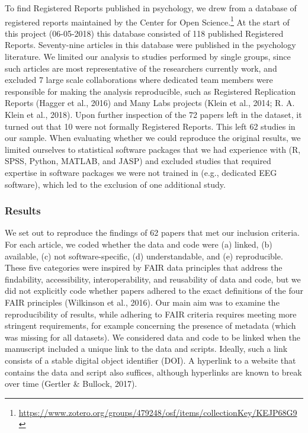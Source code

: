 \documentclass[
  ,jou, a4paper,floatsintext]{apa6}
\begin{document}
To find Registered Reports published in psychology, we drew from a database of registered reports maintained by the Center for Open Science.\footnote{\url{https://www.zotero.org/groups/479248/osf/items/collectionKey/KEJP68G9}} At the start of this project (06-05-2018) this database consisted of 118 published Registered Reports. Seventy-nine articles in this database were published in the psychology literature. We limited our analysis to studies performed by single groups, since such articles are most representative of the researchers currently work, and excluded 7 large scale collaborations where dedicated team members were responsible for making the analysis reproducible, such as Registered Replication Reports (Hagger et al., 2016) and Many Labs projects (Klein et al., 2014; R. A. Klein et al., 2018). Upon further inspection of the 72 papers left in the dataset, it turned out that 10 were not formally Registered Reports. This left 62 studies in our sample. When evaluating whether we could reproduce the original results, we limited ourselves to statistical software packages that we had experience with (R, SPSS, Python, MATLAB, and JASP) and excluded studies that required expertise in software packages we were not trained in (e.g., dedicated EEG software), which led to the exclusion of one additional study.

\hypertarget{results}{%
\subsubsection{Results}\label{results}}

We set out to reproduce the findings of 62 papers that met our inclusion criteria. For each article, we coded whether the data and code were (a) linked, (b) available, (c) not software-specific, (d) understandable, and (e) reproducible. These five categories were inspired by FAIR data principles that address the findability, accessibility, interoperability, and reusability of data and code, but we did not explicitly code whether papers adhered to the exact definitions of the four FAIR principles (Wilkinson et al., 2016). Our main aim was to examine the reproducibility of results, while adhering to FAIR criteria requires meeting more stringent requirements, for example concerning the presence of metadata (which was missing for all datasets). We considered data and code to be linked when the manuscript included a unique link to the data and scripts. Ideally, such a link consists of a stable digital object identifier (DOI). A hyperlink to a website that contains the data and script also suffices, although hyperlinks are known to break over time (Gertler \& Bullock, 2017).
\end{document}
